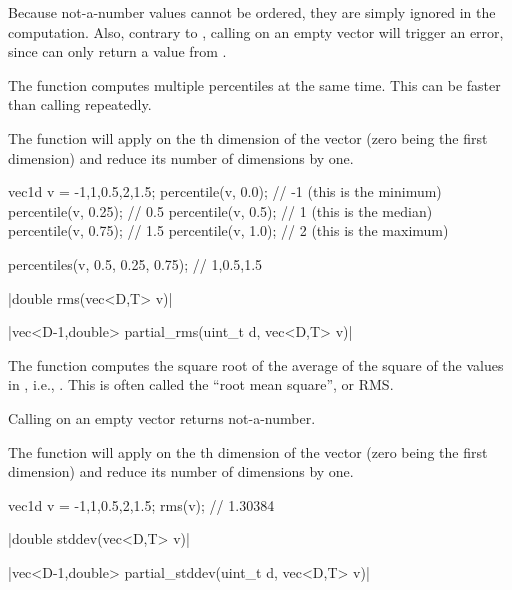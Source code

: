 Because not-a-number values cannot be ordered, they are simply ignored in the computation. Also,
contrary to , calling  on an empty vector will trigger an error, since  can only return a value from .

The function  computes multiple percentiles at the same time. This can be faster than calling  repeatedly.

The function  will apply  on the th dimension of the vector (zero being the first dimension) and reduce its number of dimensions by one.

\begin{example}
\begin{cppcode}
vec1d v = {-1,1,0.5,2,1.5};
percentile(v, 0.0);  // -1 (this is the minimum)
percentile(v, 0.25); // 0.5
percentile(v, 0.5);  // 1 (this is the median)
percentile(v, 0.75); // 1.5
percentile(v, 1.0);  // 2 (this is the maximum)

percentiles(v, 0.5, 0.25, 0.75); // {1,0.5,1.5}
\end{cppcode}
\end{example}

\funcitem \cppinline|double rms(vec<D,T> v)| 

\cppinline|vec<D-1,double> partial_rms(uint_t d, vec<D,T> v)| 

The function  computes the square root of the average of the square of the values in , i.e., . This is often called the ``root mean square'', or RMS.

Calling  on an empty vector returns not-a-number.

The function  will apply  on the th dimension of the vector (zero being the first dimension) and reduce its number of dimensions by one.

\begin{example}
\begin{cppcode}
vec1d v = {-1,1,0.5,2,1.5};
rms(v); // 1.30384
\end{cppcode}
\end{example}

\funcitem \cppinline|double stddev(vec<D,T> v)| 

\cppinline|vec<D-1,double> partial_stddev(uint_t d, vec<D,T> v)| 

